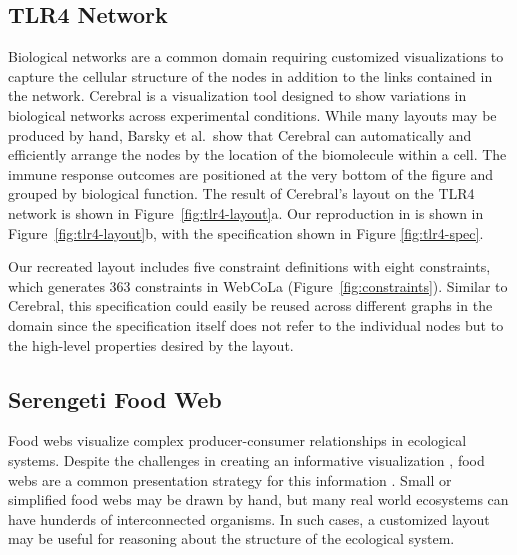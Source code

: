 \subsection{TLR4 Network}
\tlrfourSpec

Biological networks are a common domain requiring customized visualizations
to capture the cellular structure of the nodes in addition to the links
contained in the network. Cerebral \cite{barsky2008cerebral} is a visualization
tool designed to show variations in biological networks across experimental
conditions. While many layouts may be produced by hand, Barsky et al.\ show that 
Cerebral can automatically and efficiently arrange the nodes by the location
of the biomolecule within a cell. The immune response outcomes are positioned
at the very bottom of the figure and grouped by biological function. The result
of Cerebral's layout on the TLR4 network is shown in Figure~\ref{fig:tlr4-layout}a.
Our reproduction in \projectname is shown in Figure~\ref{fig:tlr4-layout}b,
with the specification shown in Figure \ref{fig:tlr4-spec}.

Our recreated layout includes five constraint definitions with eight \projectname
constraints, which generates $363$ constraints in WebCoLa (Figure~\ref{fig:constraints}).
Similar to Cerebral, this \projectname specification could easily be reused 
across different graphs in the domain since the specification itself does
not refer to the individual nodes but to the high-level properties desired
by the layout.



\subsection{Serengeti Food Web}
\krugerLayout
\serengetiLayout
\serengetiSpec

Food webs visualize complex producer-consumer relationships in ecological
systems. Despite the challenges in creating an informative
visualization \cite{kearney2016blog}, food webs are a common presentation strategy for this information
\cite{hinke2004visualizing,harper2006dynamic,lavigne1996cod,baskerville2011spatial,yodzis1998local,cohen2003ecological,benson2016higher,kruger2017}. Small or simplified food webs may be
drawn by hand, but many real world ecosystems can have hunderds of
interconnected organisms. In such cases, a customized layout may be useful
for reasoning about the structure of the ecological system.

